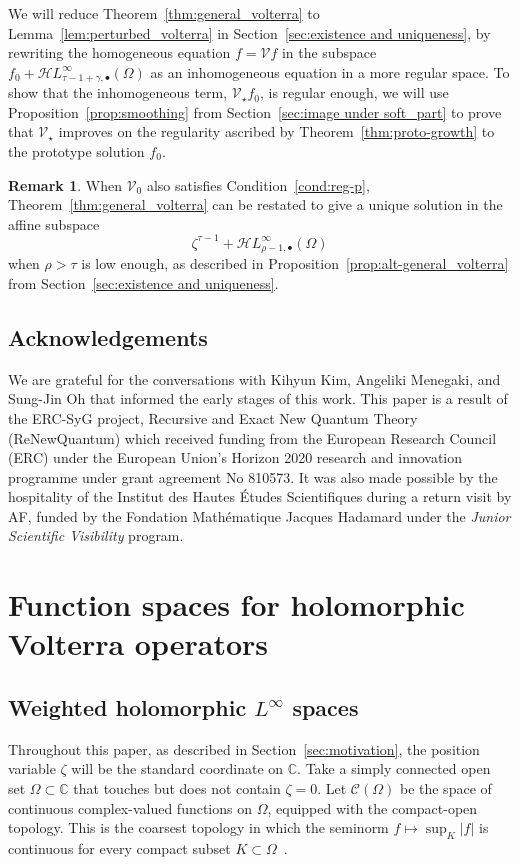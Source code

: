 \documentclass{article}
\theoremstyle{definition}
\newtheorem{rmk}{Remark}
\theoremstyle{plain}
\newcommand{\C}{\mathbb{C}}
\newcommand{\cont}{\mathcal{C}}
\newcommand{\singexp}[2]{\mathcal{H}L^\infty_{#1, #2}}
\newcommand{\singexpalg}[1]{\singexp{#1}{\bullet}}
\newcommand{\volterra}{\mathcal{V}}
\newcommand{\hardpart}{\mathcal{V}_0}
\newcommand{\softpart}{\mathcal{V}_\star}
\newcommand{\domain}{\Omega}
\begin{document}
We will reduce Theorem~\ref{thm:general_volterra} to Lemma~\ref{lem:perturbed_volterra} in Section~\ref{sec:existence and uniqueness}, by rewriting the homogeneous equation $f = \volterra f$ in the subspace $f_0 + \singexpalg{\tau-1+\gamma}(\Omega)$ as an inhomogeneous equation in a more regular space. To show that the inhomogeneous term, $\softpart f_0$, is regular enough, we will use Proposition~\ref{prop:smoothing} from Section~\ref{sec:image under soft_part} to prove that $\softpart$ improves on the regularity ascribed by Theorem~\ref{thm:proto-growth} to the prototype solution $f_0$.
\begin{rmk}
When $\hardpart$ also satisfies Condition~\eqref{cond:reg-p}, Theorem~\ref{thm:general_volterra} can be restated to give a unique solution in the affine subspace
\[ \zeta^{\tau-1} + \singexpalg{\rho-1}(\domain) \]
when $\rho > \tau$ is low enough, as described in Proposition~\ref{prop:alt-general_volterra} from Section~\ref{sec:existence and uniqueness}.
\end{rmk}
\subsection{Acknowledgements}
We are grateful for the conversations with Kihyun Kim, Angeliki Menegaki, and Sung-Jin Oh that informed the early stages of this work. This paper is a result of the ERC-SyG project, Recursive and Exact New Quantum Theory (ReNewQuantum) which received funding from the European Research Council (ERC) under the European Union's Horizon 2020 research and innovation programme under grant agreement No 810573. It was also made possible by the hospitality of the Institut des Hautes \'{E}tudes Scientifiques during a return visit by AF, funded by the Fondation Math\'{e}matique Jacques Hadamard under the \textit{Junior Scientific Visibility} program.
\section{Function spaces for holomorphic Volterra operators}\label{fn-spaces}
\subsection{Weighted holomorphic $L^{\infty}$ spaces}\label{sec:fn-space-defs}
Throughout this paper, as described in Section~\ref{sec:motivation}, the position variable $\zeta$ will be the standard coordinate on $\C$. Take a simply connected open set $\domain \subset \C$ that touches but does not contain $\zeta = 0$. Let $\cont(\domain)$ be the space of continuous complex-valued functions on $\domain$, equipped with the compact-open topology. This is the coarsest topology in which the seminorm $f \mapsto \sup_K |f|$ is continuous for every compact subset $K \subset \domain$~\cite[Example~2.6 and Section~4 notes]{fnl-cpx-anal}.
\end{document}

